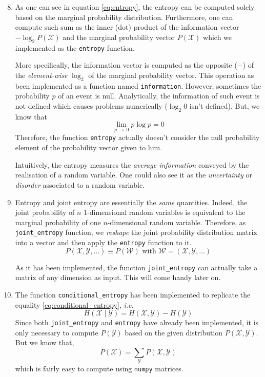 \documentclass[a4paper, 12pt]{article}
\newcommand{\W}{\mathcal{W}}
\newcommand{\X}{\mathcal{X}}
\newcommand{\Y}{\mathcal{Y}}
\begin{document}
    \begin{enumerate}[leftmargin=*]
        \setcounter{enumi}{7}
        \item As one can see in equation \eqref{eq:entropy}, the entropy can be computed solely based on the marginal probability distribution. Furthermore, one can compute such sum as the inner (dot) product of the information vector $- \log_2 P(\X)$ and the marginal probability vector $P(\X)$ which we implemented as the \texttt{entropy} function.
        
        More specifically, the information vector is computed as the opposite ($-$) of the \emph{element-wise} $\log_2$ of the marginal probability vector. This operation as been implemented as a function named \texttt{information}. However, sometimes the probability $p$ of an event is null. Analytically, the information of such event is not defined which causes problems numerically ($\log_2 0$ isn't defined). But, we know that 
        $$ \lim_{p \,\to\, 0} p \log p = 0 $$
        Therefore, the function \texttt{entropy} actually doesn't consider the null probability element of the probability vector given to him.
        
        Intuitively, the entropy measures the \emph{average information} conveyed by the realisation of a random variable. One could also see it as the \emph{uncertainty} or \emph{disorder} associated to a random variable.
        
        \item Entropy and joint entropy are essentially the \emph{same} quantities. Indeed, the joint probability of $n$ $1$-dimensional random variables is equivalent to the marginal probability of one $n$-dimensional random variable. Therefore, as \texttt{joint\_entropy} function, we \emph{reshape} the joint probability distribution matrix into a vector and then apply the \texttt{entropy} function to it.
        $$P(\X, \Y, \ldots) \equiv P(\W) \text{ with } \W = (\X, \Y, \ldots) $$
        
        \begin{rmk}
            As it has been implemented, the function \texttt{joint\_entropy} can actually take a matrix of any dimension as input. This will come handy later on.
        \end{rmk}
        
        \item The function \texttt{conditional\_entropy} has been implemented to replicate the equality \eqref{eq:conditional_entropy}, \emph{i.e.}
        $$ H(\X \mid \Y) = H(\X, \Y) - H(\Y) $$
        Since both \texttt{joint\_entropy} and \texttt{entropy} have already been implemented, it is only necessary to compute $P(\Y)$ based on the given distribution $P(\X, \Y)$. But we know that,
        $$ P(\X) = \sum_\Y P(\X, \Y) $$
        which is fairly easy to compute using \texttt{numpy} matrices.
        

\end{enumerate}
\end{document}
